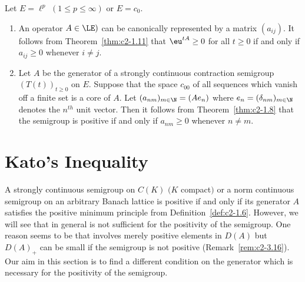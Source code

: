 \begin{examples}\label{ex:c2-1.13}
%
Let $E = \ell^p$ $(1 \leq p \leq \infty)$ or $E = c_{0}$.
\begin{enumerate}[\upshape (i), wide, labelindent=.25em] %
\item \label{ex:c2-1.13-1}
An operator $A \in \LE)$ can be canonically represented by a matrix $(a_{ij})$. 
It follows from Theorem~\ref{thm:c2-1.11} that $\eu^{tA} \geq 0$ for all $t \geq 0$ if and only if\/ $a_{ij} \geq 0$ whenever $i \neq j$.
\item \label{ex:c2-1.13-2}
Let $A$ be the generator of a strongly continuous contraction semigroup $(T(t))_{t \geq 0}$ on $E$.
Suppose that the space $c_{00}$ of all sequences which vanish off a finite set is a core of\/ $A$.
Let $(a_{nm})_{m \in \N} = (Ae_{n})$ where $e_{n} = (\delta_{nm})_{m \in \N}$ denotes the $n^{th}$ unit vector.
Then it follows from Theorem~\ref{thm:c2-1.8}   that the semigroup is positive if and only if\/ $a_{nm} \geq 0$ whenever $n \neq m$.
\end{enumerate}
\end{examples}
\section{Kato's Inequality} \label{sec:c2-2}
%
A strongly continuous semigroup on $C(K)$ $(K$ compact$)$ or a norm continuous semigroup on an arbitrary Banach lattice is positive if and only if its generator $A$ satisfies the positive minimum principle  from Definition~\ref{def:c2-1.6}.
However, we will see that in general  is not sufficient for the positivity of the semigroup.
One reason seems to be that  involves merely positive elements in $D(A)$ but $D(A)_{+}$ can be small if the semigroup is not positive (\cf Remark~\ref{rem:c2-3.16}).
Our aim in this section is to find a different condition on the generator which is necessary for the positivity of the semigroup.

